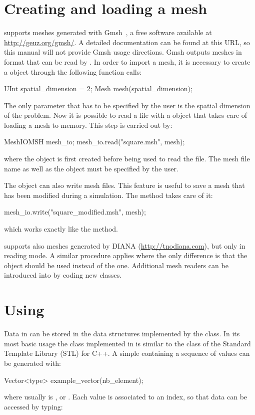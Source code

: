 \section{Creating and loading a mesh\label{sect:common:mesh}}

\akantu supports meshes generated with Gmsh~\cite{gmsh2009}, a free
software available at \url{http://geuz.org/gmsh/}. A detailed
documentation can be found at this URL, so this manual will not provide
Gmsh usage directions. Gmsh outputs meshes in  format that can be read
by \akantu. In order to import a mesh, it is necessary to create
a  object through the following function calls:
\begin{cpp}
  UInt spatial_dimension = 2;
  Mesh mesh(spatial_dimension);
\end{cpp}
The only parameter that has to be specified by the user is the spatial
dimension of the problem. Now it is possible to read a  file with
a  object that takes care of loading a mesh to memory.
This step is carried out by:
\begin{cpp}
  MeshIOMSH mesh_io;
  mesh_io.read("square.msh", mesh);
\end{cpp}
where the  object is first created before being
used to read the  file. The mesh file name as well as the 
object must be specified by the user.

The  object can also write mesh files. This feature
is useful to save a mesh that has been modified during a
simulation. The  method takes care of it:
\begin{cpp}
  mesh_io.write("square_modified.msh", mesh);
\end{cpp}
which works exactly like the  method.

\akantu supports also meshes generated by
DIANA (\url{http://tnodiana.com}), but only in reading mode. A similar
procedure applies where the only
difference is that the  object should be used
instead of the  one. Additional mesh readers can be
introduced into \akantu by coding new  classes.

\section{Using }

Data in \akantu can be stored in the data structures implemented by
the  class. In its most basic usage the  class
implemented in \akantu is similar to the  class of
the Standard Template Library (STL) for C++. A simple 
containing a sequence of  values can be generated with:
\begin{cpp}
  Vector<type> example_vector(nb_element);
\end{cpp}
where  usually is ,  or
. Each value is associated to an index, so that data can be
accessed by typing:

